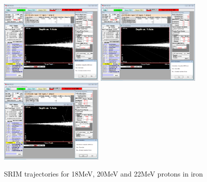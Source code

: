 \begin{figure}[!htb]
  \begin{center}
    \includegraphics[width=5.0cm]{appendix/srim_data/18MeV.png}
    \includegraphics[width=5.0cm]{appendix/srim_data/20MeV.png}
    \includegraphics[width=5.0cm]{appendix/srim_data/22MeV.png}
    \caption{SRIM trajectories for 18MeV, 20MeV and 22MeV protons in iron}
    \label{fig:srimiron-18-20-22}
  \end{center}
\end{figure}

